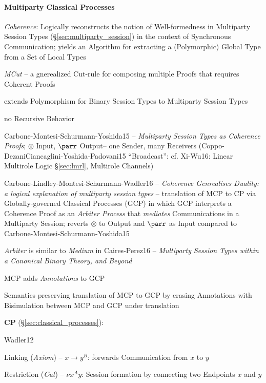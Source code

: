 \paragraph{Multiparty Classical Processes}\label{sec:mcp}\hfill

\emph{Coherence}: Logically reconstructs the notion of Well-formedness
in Multiparty Session Types (\S\ref{sec:multiparty_session}) in the
context of Synchronous Communication; yields an Algorithm for
extracting a (Polymorphic) Global Type from a Set of Local Types

\emph{MCut} -- a gnerealized Cut-rule for composing multiple Proofs
that requires Coherent Proofs

extends Polymorphism for Binary Session Types to Multiparty Session
Types

no Recursive Behavior

Carbone-Montesi-Schurmann-Yoshida15 -- \emph{Multiparty Session Types
  as Coherence Proofs}; $\otimes$ Input, $\parr$ Output-- one Sender,
many Receivers (Coppo-DezaniCiancaglini-Yoshida-Padovani15
``Broadcast'': cf. Xi-Wu16: Linear Multirole Logic \S\ref{sec:lmrl},
Multirole Channels)

Carbone-Lindley-Montesi-Schurmann-Wadler16 -- \emph{Coherence Genrealises
  Duality: a logical explanation of multiparty session types} --
translation of MCP to CP via Globally-governed Classical Processes
(GCP) in which GCP interprets a Coherence Proof as an \emph{Arbiter
  Process} that \emph{mediates} Communications in a Multiparty
Session; reverts $\otimes$ to Output and $\parr$ as Input compared to
Carbone-Montesi-Schurmann-Yoshida15

\emph{Arbiter} is similar to \emph{Medium} in Caires-Perez16 --
\emph{Multiparty Session Types within a Canonical Binary Theory, and
  Beyond}

MCP adds \emph{Annotations} to GCP

Semantics preserving translation of MCP to GCP by erasing Annotations
with Bisimulation between MCP and GCP under translation


\textbf{CP} (\S\ref{sec:classical_processes}):

Wadler12


Linking (\emph{Axiom}) -- $x \rightarrow y^B$: forwards Communication
from $x$ to $y$

Restriction (\emph{Cut}) -- $\nu x^A y$: Session formation by
connecting two Endpoints $x$ and $y$

